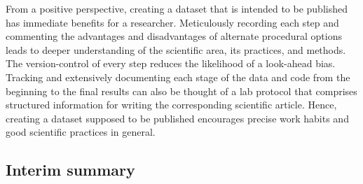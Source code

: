 %
From a positive perspective, creating a dataset that is intended to be published
has immediate benefits for a researcher.
%
Meticulously recording each step and commenting the advantages and disadvantages
of alternate procedural options leads to deeper understanding of the scientific
area, its practices, and methods.
%
The version-control of every step reduces the likelihood of a look-ahead bias.
%
Tracking and extensively documenting each stage of the data and code from the
beginning to the final results can also be thought of a lab protocol that
comprises structured information for writing the corresponding scientific
article.
%
Hence, creating a dataset supposed to be published encourages precise work
habits and good scientific practices in general.


\subsection{Interim summary}



